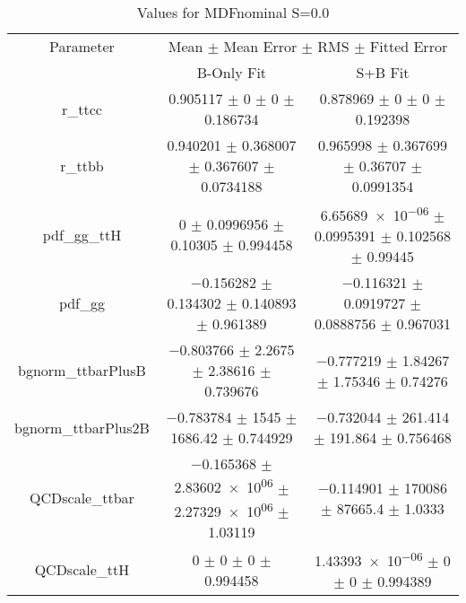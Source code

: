 \begin{table}
\centering
\caption{Values for MDFnominal S=0.0}
\begin{tabular}{ccc}
\toprule
Parameter & \multicolumn{2}{c}{Mean $\pm$ Mean Error $\pm$ RMS $\pm$ Fitted Error}\\
 & B-Only Fit & S+B Fit\\
\midrule
r\_ttcc & \num{0.905117} $\pm$ \num{0} $\pm$ \num{0} $\pm$ \num{0.186734} & \num{0.878969} $\pm$ \num{0} $\pm$ \num{0} $\pm$ \num{0.192398}\\
r\_ttbb & \num{0.940201} $\pm$ \num{0.368007} $\pm$ \num{0.367607} $\pm$ \num{0.0734188} & \num{0.965998} $\pm$ \num{0.367699} $\pm$ \num{0.36707} $\pm$ \num{0.0991354}\\
pdf\_gg\_ttH & \num{0} $\pm$ \num{0.0996956} $\pm$ \num{0.10305} $\pm$ \num{0.994458} & \num{6.65689e-06} $\pm$ \num{0.0995391} $\pm$ \num{0.102568} $\pm$ \num{0.99445}\\
pdf\_gg & \num{-0.156282} $\pm$ \num{0.134302} $\pm$ \num{0.140893} $\pm$ \num{0.961389} & \num{-0.116321} $\pm$ \num{0.0919727} $\pm$ \num{0.0888756} $\pm$ \num{0.967031}\\
bgnorm\_ttbarPlusB & \num{-0.803766} $\pm$ \num{2.2675} $\pm$ \num{2.38616} $\pm$ \num{0.739676} & \num{-0.777219} $\pm$ \num{1.84267} $\pm$ \num{1.75346} $\pm$ \num{0.74276}\\
bgnorm\_ttbarPlus2B & \num{-0.783784} $\pm$ \num{1545} $\pm$ \num{1686.42} $\pm$ \num{0.744929} & \num{-0.732044} $\pm$ \num{261.414} $\pm$ \num{191.864} $\pm$ \num{0.756468}\\
QCDscale\_ttbar & \num{-0.165368} $\pm$ \num{2.83602e+06} $\pm$ \num{2.27329e+06} $\pm$ \num{1.03119} & \num{-0.114901} $\pm$ \num{170086} $\pm$ \num{87665.4} $\pm$ \num{1.0333}\\
QCDscale\_ttH & \num{0} $\pm$ \num{0} $\pm$ \num{0} $\pm$ \num{0.994458} & \num{1.43393e-06} $\pm$ \num{0} $\pm$ \num{0} $\pm$ \num{0.994389}\\
\bottomrule
\end{tabular}
\end{table}